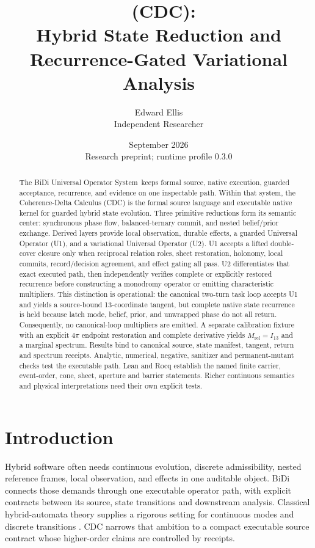\documentclass[11pt]{article}
\title{\CDC\ (CDC):\\Hybrid State Reduction and\\Recurrence-Gated Variational Analysis}
\author{Edward Ellis\\Independent Researcher}
\date{September 2026\\[.4em]\small Research preprint; runtime profile 0.3.0}
\newcommand{\BiDiSystem}{BiDi Universal Operator System}
\begin{document}
\maketitle

\begin{abstract}
The \BiDiSystem\ keeps formal source, native execution, guarded acceptance,
recurrence, and evidence on one inspectable path. Within that system, the
Coherence-Delta Calculus (CDC) is the formal source language and executable
native kernel for guarded hybrid state evolution. Three primitive reductions
form its semantic center: synchronous phase flow, balanced-ternary commit, and nested
belief/prior exchange. Derived layers provide local observation, durable
effects, a guarded Universal Operator (U1), and a variational Universal
Operator (U2). U1 accepts a lifted double-cover closure only when reciprocal
relation roles, sheet restoration, holonomy, local commits, record/decision
agreement, and effect gating all pass. U2 differentiates that exact executed
path, then independently verifies complete or explicitly restored recurrence
before constructing a monodromy operator or emitting characteristic
multipliers. This distinction is operational: the canonical two-turn task loop
accepts U1 and yields a source-bound 13-coordinate tangent, but complete native
state recurrence is held because latch mode, belief, prior, and unwrapped phase
do not all return. Consequently, no canonical-loop multipliers are emitted. A
separate calibration fixture with an explicit $4\pi$ endpoint restoration and
complete derivative yields $M_{\mathrm{rel}}=I_{13}$ and a marginal spectrum.
Results bind to canonical source, state manifest, tangent, return and spectrum
receipts. Analytic, numerical, negative, sanitizer and permanent-mutant checks
test the executable path. Lean and Rocq establish the named finite carrier,
event-order, cone, sheet, aperture and barrier statements. Richer continuous
semantics and physical interpretations need their own explicit tests.
\end{abstract}

\section{Introduction}

Hybrid software often needs continuous evolution, discrete admissibility,
nested reference frames, local observation, and effects in one auditable object.
BiDi connects those demands through one executable operator path, with explicit
contracts between its source, state transitions and downstream analysis.
Classical hybrid-automata theory supplies a rigorous setting for continuous
modes and discrete transitions \cite{henzinger1996}. CDC narrows that ambition to
a compact executable source contract whose higher-order claims are controlled by
receipts.
\end{document}
